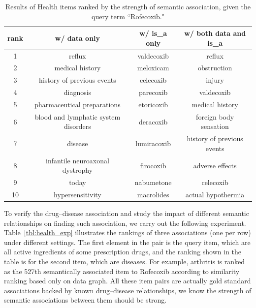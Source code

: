 \begin{table}[tbh]\scriptsize
\begin{center}
\begin{tabular}{ c | c | c | c  }
\hline
rank    &   w/ data only	&	w/ is\_a only		& w/ both data and is\_a \\
\hline
1	&		reflux	&	valdecoxib	&		reflux	\\
2	&		medical history	&	meloxicam	&		obstruction	\\
3	&		history of previous events	&	celecoxib	&		injury	\\
4	&		diagnosis	&	parecoxib	&		valdecoxib	\\
5	&		pharmaceutical preparations	&	etoricoxib	&		medical history	\\
6	&		blood and lymphatic system disorders	&	deracoxib	&		foreign body sensation	\\
7	&		disease	&	lumiracoxib	&		history of previous events	\\
8	&		infantile neuroaxonal dystrophy	&	firocoxib	&		adverse effects	\\
9	&		today	&	nabumetone	&		celecoxib	\\
10	&		hypersensitivity	&	macrolides	&		actual hypothermia	\\
\hline
\end{tabular}
\end{center}
\caption[Top results on the electronic health dataset]{\label{tbl:health_comp}Results of Health items ranked by the strength of semantic association, given the query term ``Rofecoxib."}
\end{table}

To verify the drug--disease association and study the impact of different semantic relationships on finding such association, we carry out the following experiment. Table~\ref{tbl:health_exp} illustrates the rankings of three associations (one per row) under different settings. The first element in the pair is the query item, which are all active ingredients of some prescription drugs, and the ranking shown in the table is for the second item, which are diseases. For example, arthritis is ranked as the 527th semantically associated item to Rofecoxib according to similarity ranking based only on data graph. All these item pairs are actually gold standard associations backed by known drug--disease relationships, we know the strength of semantic associations between them should be strong.


